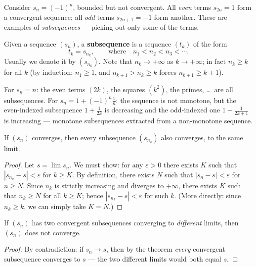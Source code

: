 \documentclass[11pt]{report}
\begin{document}
Consider $s_n = (-1)^n$, bounded but not convergent. All \emph{even} terms $s_{2n} = 1$ form a convergent sequence; all \emph{odd} terms $s_{2n+1} = -1$ form another. These are examples of \emph{subsequences} --- picking out only some of the terms.

\begin{defbox}[Subsequence]
Given a sequence $(s_n)$, a \textbf{subsequence} is a sequence $(t_k)$ of the form
\[
t_k = s_{n_k}, \qquad \text{where} \quad n_1 < n_2 < n_3 < \cdots.
\]
Usually we denote it by $(s_{n_k})$. Note that $n_k \to +\infty$ as $k \to +\infty$; in fact $n_k \geq k$ for all $k$ (by induction: $n_1 \geq 1$, and $n_{k+1} > n_k \geq k$ forces $n_{k+1} \geq k+1$).
\end{defbox}

\begin{exbox}
For $s_n = n$: the even terms $(2k)$, the squares $(k^2)$, the primes, \ldots\ are all subsequences. For $s_n = 1 + (-1)^n \tfrac1n$: the sequence is not monotone, but the even-indexed subsequence $1 + \tfrac{1}{2k}$ is decreasing and the odd-indexed one $1 - \tfrac{1}{2k+1}$ is increasing --- monotone subsequences extracted from a non-monotone sequence.
\end{exbox}

\begin{thmbox}
If $(s_n)$ converges, then every subsequence $(s_{n_k})$ also converges, to the same limit.
\end{thmbox}

\begin{proof}
Let $s = \lim s_n$. We must show: for any $\varepsilon > 0$ there exists $K$ such that $|s_{n_k} - s| < \varepsilon$ for $k \geq K$. By definition, there exists $N$ such that $|s_n - s| < \varepsilon$ for $n \geq N$. Since $n_k$ is strictly increasing and diverges to $+\infty$, there exists $K$ such that $n_k \geq N$ for all $k \geq K$; hence $|s_{n_k} - s| < \varepsilon$ for such $k$. (More directly: since $n_k \geq k$, we can simply take $K = N$.)
\end{proof}

\begin{corbox}
If $(s_n)$ has two convergent subsequences converging to \emph{different} limits, then $(s_n)$ does not converge.
\end{corbox}

\begin{proof}
By contradiction: if $s_n \to s$, then by the theorem \emph{every} convergent subsequence converges to $s$ --- the two different limits would both equal $s$.
\end{proof}
\end{document}
